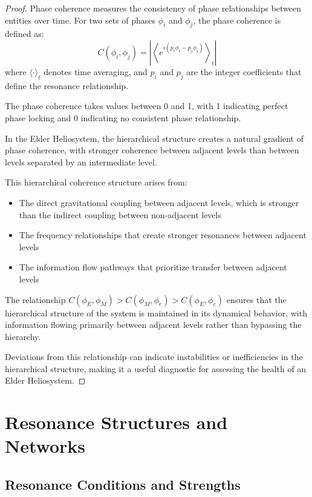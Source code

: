 \begin{proof}
Phase coherence measures the consistency of phase relationships between entities over time. For two sets of phases $\phi_i$ and $\phi_j$, the phase coherence is defined as:
\begin{equation}
C(\phi_i, \phi_j) = \left|\left\langle e^{i(p_i\phi_i - p_j\phi_j)}\right\rangle_t\right|
\end{equation}
where $\langle \cdot \rangle_t$ denotes time averaging, and $p_i$ and $p_j$ are the integer coefficients that define the resonance relationship.

The phase coherence takes values between 0 and 1, with 1 indicating perfect phase locking and 0 indicating no consistent phase relationship.

In the Elder Heliosystem, the hierarchical structure creates a natural gradient of phase coherence, with stronger coherence between adjacent levels than between levels separated by an intermediate level.

This hierarchical coherence structure arises from:
\begin{itemize}
    \item The direct gravitational coupling between adjacent levels, which is stronger than the indirect coupling between non-adjacent levels
    \item The frequency relationships that create stronger resonances between adjacent levels
    \item The information flow pathways that prioritize transfer between adjacent levels
\end{itemize}

The relationship $C(\phi_E, \phi_M) > C(\phi_M, \phi_e) > C(\phi_E, \phi_e)$ ensures that the hierarchical structure of the system is maintained in its dynamical behavior, with information flowing primarily between adjacent levels rather than bypassing the hierarchy.

Deviations from this relationship can indicate instabilities or inefficiencies in the hierarchical structure, making it a useful diagnostic for assessing the health of an Elder Heliosystem.
\end{proof}

\section{Resonance Structures and Networks}

\subsection{Resonance Conditions and Strengths}

